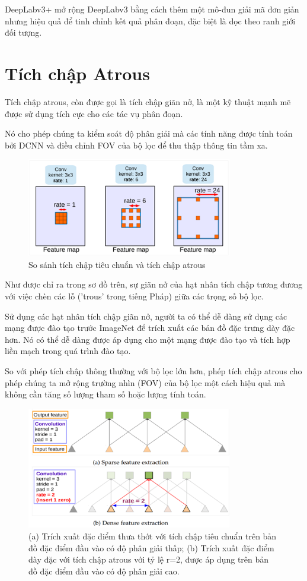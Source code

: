 \documentclass[12pt]{report}
\begin{document}
DeepLabv3+ mở rộng DeepLabv3 bằng cách thêm một mô-đun giải mã đơn giản nhưng hiệu quả để tinh chỉnh kết quả phân đoạn, đặc biệt là dọc theo ranh giới đối tượng.

\section*{Tích chập Atrous}
Tích chập atrous, còn được gọi là tích chập giãn nở, là một kỹ thuật mạnh mẽ được sử dụng tích cực cho các tác vụ phân đoạn.

Nó cho phép chúng ta kiểm soát độ phân giải mà các tính năng được tính toán bởi DCNN và điều chỉnh FOV của bộ lọc để thu thập thông tin tầm xa.

\begin{figure}[h]
    \centering
    \includegraphics[width=0.8\textwidth]{atrous.png}
    \caption{So sánh tích chập tiêu chuẩn và tích chập atrous}
\end{figure}

Như được chỉ ra trong sơ đồ trên, sự giãn nở của hạt nhân tích chập tương đương với việc chèn các lỗ ('trous' trong tiếng Pháp) giữa các trọng số bộ lọc.

Sử dụng các hạt nhân tích chập giãn nở, người ta có thể dễ dàng sử dụng các mạng được đào tạo trước ImageNet để trích xuất các bản đồ đặc trưng dày đặc hơn. Nó có thể dễ dàng được áp dụng cho một mạng được đào tạo và tích hợp liền mạch trong quá trình đào tạo.

So với phép tích chập thông thường với bộ lọc lớn hơn, phép tích chập atrous cho phép chúng ta mở rộng trường nhìn (FOV) của bộ lọc một cách hiệu quả mà không cần tăng số lượng tham số hoặc lượng tính toán.

\begin{figure}[h]
    \centering
    \includegraphics[width=0.8\textwidth]{thua_thot.png}
    \caption{(a) Trích xuất đặc điểm thưa thớt với tích chập tiêu chuẩn trên bản đồ đặc điểm đầu vào có độ phân giải thấp; (b) Trích xuất đặc điểm dày đặc với tích chập atrous với tỷ lệ r=2, được áp dụng trên bản đồ đặc điểm đầu vào có độ phân giải cao.}
\end{figure}
\end{document}
